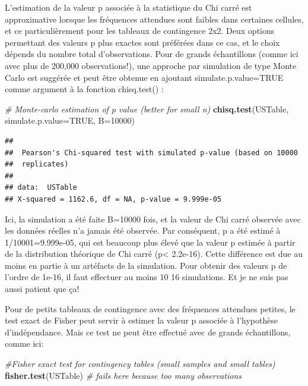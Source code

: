 \documentclass[12pt,]{book}
\newenvironment{Shaded}{\begin{snugshade}}{\end{snugshade}}
\newcommand{\CommentTok}[1]{\textcolor[rgb]{0.56,0.35,0.01}{\textit{#1}}}
\newcommand{\DataTypeTok}[1]{\textcolor[rgb]{0.13,0.29,0.53}{#1}}
\newcommand{\DecValTok}[1]{\textcolor[rgb]{0.00,0.00,0.81}{#1}}
\newcommand{\KeywordTok}[1]{\textcolor[rgb]{0.13,0.29,0.53}{\textbf{#1}}}
\newcommand{\NormalTok}[1]{#1}
\newcommand{\OtherTok}[1]{\textcolor[rgb]{0.56,0.35,0.01}{#1}}
\begin{document}
L'estimation de la valeur p associée à la statistique du Chi carré est approximative lorsque les fréquences attendues sont faibles dans certaines cellules, et ce particulièrement pour les tableaux de contingence 2x2. Deux options permettant des valeurs p plus exactes sont préférées dans ce cas, et le choix dépends du nombre total d'observations. Pour de grands échantillons (comme ici avec plus de 200,000 observations!), une approche par simulation de type Monte Carlo est suggérée et peut être obtenue en ajoutant simulate.p.value=TRUE comme argument à la fonction chisq.test() :

\begin{Shaded}
\begin{Highlighting}[]
\CommentTok{# Monte-carlo estimation of p value (better for small n)}
\KeywordTok{chisq.test}\NormalTok{(USTable, }\DataTypeTok{simulate.p.value=}\OtherTok{TRUE}\NormalTok{, }\DataTypeTok{B=}\DecValTok{10000}\NormalTok{)}
\end{Highlighting}
\end{Shaded}

\begin{verbatim}
## 
##  Pearson's Chi-squared test with simulated p-value (based on 10000
##  replicates)
## 
## data:  USTable
## X-squared = 1162.6, df = NA, p-value = 9.999e-05
\end{verbatim}

Ici, la simulation a été faite B=10000 fois, et la valeur de Chi carré observée avec les données réelles n'a jamais été observée. Par conséquent, p a été estimé à 1/10001=9.999e-05, qui est beaucoup plus élevé que la valeur p estimée à partir de la distribution théorique de Chi carré (p\textless{} 2.2e-16). Cette différence est due au moins en partie à un artéfacts de la simulation. Pour obtenir des valeurs p de l'ordre de 1e-16, il faut effectuer au moins 10 16 simulations. Et je ne suis pas aussi patient que ça!

Pour de petits tableaux de contingence avec des fréquences attendues petites, le test exact de Fisher peut servir à estimer la valeur p associée à l'hypothèse d'indépendance. Mais ce test ne peut être effectué avec de grands échantillons, comme ici:

\begin{Shaded}
\begin{Highlighting}[]
\CommentTok{#Fisher exact test for contingency tables (small samples and small tables)}
\KeywordTok{fisher.test}\NormalTok{(USTable) }\CommentTok{# fails here because too many observations}
\end{Highlighting}
\end{Shaded}
\end{document}
